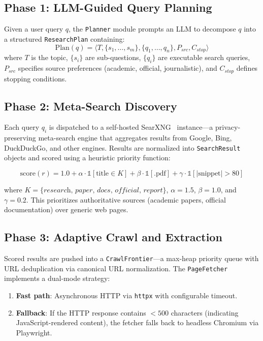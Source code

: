\documentclass[conference]{IEEEtran}
\begin{document}
\subsection{Phase 1: LLM-Guided Query Planning}

Given a user query $q$, the \texttt{Planner} module prompts an LLM to decompose $q$ into a structured \texttt{ResearchPlan} containing:
\begin{equation}
\text{Plan}(q) = \langle T, \{s_1, \ldots, s_m\}, \{q_1, \ldots, q_n\}, P_{src}, C_{stop} \rangle
\end{equation}
where $T$ is the topic, $\{s_i\}$ are sub-questions, $\{q_i\}$ are executable search queries, $P_{src}$ specifies source preferences (academic, official, journalistic), and $C_{stop}$ defines stopping conditions.

\subsection{Phase 2: Meta-Search Discovery}

Each query $q_i$ is dispatched to a self-hosted SearXNG~\cite{searxng} instance---a privacy-preserving meta-search engine that aggregates results from Google, Bing, DuckDuckGo, and other engines. Results are normalized into \texttt{SearchResult} objects and scored using a heuristic priority function:

\begin{equation}
\text{score}(r) = 1.0 + \alpha \cdot \mathbb{1}[\text{title} \in K] + \beta \cdot \mathbb{1}[\text{.pdf}] + \gamma \cdot \mathbb{1}[|\text{snippet}| > 80]
\label{eq:scoring}
\end{equation}

where $K = \{\textit{research, paper, docs, official, report}\}$, $\alpha = 1.5$, $\beta = 1.0$, and $\gamma = 0.2$. This prioritizes authoritative sources (academic papers, official documentation) over generic web pages.

\subsection{Phase 3: Adaptive Crawl and Extraction}

Scored results are pushed into a \texttt{CrawlFrontier}---a max-heap priority queue with URL deduplication via canonical URL normalization. The \texttt{PageFetcher} implements a dual-mode strategy:

\begin{enumerate}
    \item \textbf{Fast path}: Asynchronous HTTP via \texttt{httpx} with configurable timeout.
    \item \textbf{Fallback}: If the HTTP response contains $<500$ characters (indicating JavaScript-rendered content), the fetcher falls back to headless Chromium via Playwright.
\end{enumerate}
\end{document}
